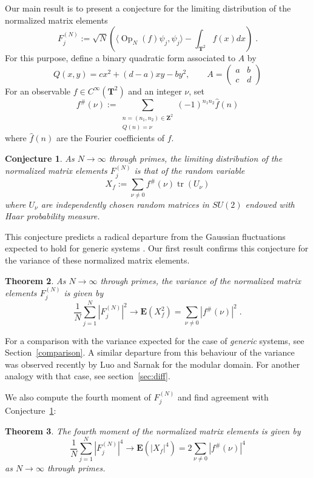 \documentclass[12pt]{amsart}
\newtheorem{thm}{Theorem}%
\newtheorem{conj}[thm]{Conjecture}
\theoremstyle{plain}
\newcommand{\Z}{{\mathbf Z}}
\newcommand{\TT}{\mathbf T^2}
\newcommand{\OPN}{\operatorname{Op}_N}
\newcommand{\tr}{\operatorname{tr}}
\renewcommand{\^}{\widehat}
\newcommand{\fs}{f^\#}
\newcommand{\Ex}{\mathbf E}
\newcommand{\vnn}{\nu}
\begin{document}
Our main result is to present a conjecture for the limiting  distribution 
of the normalized matrix elements 
$$
F_j^{(N)}:=\sqrt{N}\left(\langle \OPN(f)\psi_j,\psi_j\rangle -\int_{\TT}
f(x) dx \right)\;. 
$$
For this purpose, define a binary quadratic form associated to $A$
by
$$
Q(x,y) =cx^2+(d-a)xy-by^2,\qquad
A=\begin{pmatrix}a&b\\c&d\end{pmatrix}
$$
For an observable $f\in C^\infty(\TT)$ and an integer $\vnn$, set
$$
\fs(\vnn ):=\sum_{\substack {n=(n_1,n_2)\in \Z^2 \\ Q(n)=\vnn }} 
(-1)^{n_1 n_2} \^f(n)
$$
where $\^f(n)$ are the Fourier coefficients of $f$. 
\begin{conj}\label{conj1}
As $N\to\infty$ through primes, the limiting distribution of the
normalized matrix elements $F_j^{(N)}$ is that of the random variable
$$
X_f:= \sum_{\vnn \neq 0} \fs(\vnn) \tr(U_\vnn)
$$
where $U_{\vnn}$ are independently chosen random matrices in $SU(2)$
endowed with Haar probability measure.
\end{conj}


This conjecture predicts a radical departure from the Gaussian
fluctuations expected to hold for generic systems
\cite{feingold-peres-matrix-elements, EFKAMM}. Our 
first result confirms this conjecture for the variance of these
normalized matrix elements.
\begin{thm}
\label{thm:variance}
As $N\to \infty$ through primes, the variance of the normalized
matrix elements $F_j^{(N)}$ is given by
\begin{equation}\label{our variance} 
\frac 1N\sum_{j=1}^N |F_j^{(N)}|^2 \to \Ex(X_f^2) = \sum_{\vnn\neq 0}
|\fs(\vnn)|^2 \;.
\end{equation}
\end{thm}
For a comparison with the variance expected
for the case of {\em generic} systems, see Section~\ref{comparison}. 
A similar departure from this behaviour of the variance was
observed recently by Luo and Sarnak \cite{luo-sarnak-matrix-elements}
for the modular domain. For another analogy with that case, see
section~\ref{sec:diff}.  


We also compute  the fourth moment of $F_j^{(N)}$ and
find agreement with Conjecture~\ref{conj1}:
\begin{thm}
\label{thm:fourth-moment}
The fourth moment of the normalized matrix elements is given by
$$
\frac 1N\sum_{j=1}^N |F_j^{(N)}|^4 \to \Ex(|X_f|^4) = 
2\sum_{\vnn\neq 0} |\fs(\vnn)|^4
$$
as $N\to \infty$ through primes.
\end{thm}
\end{document}
